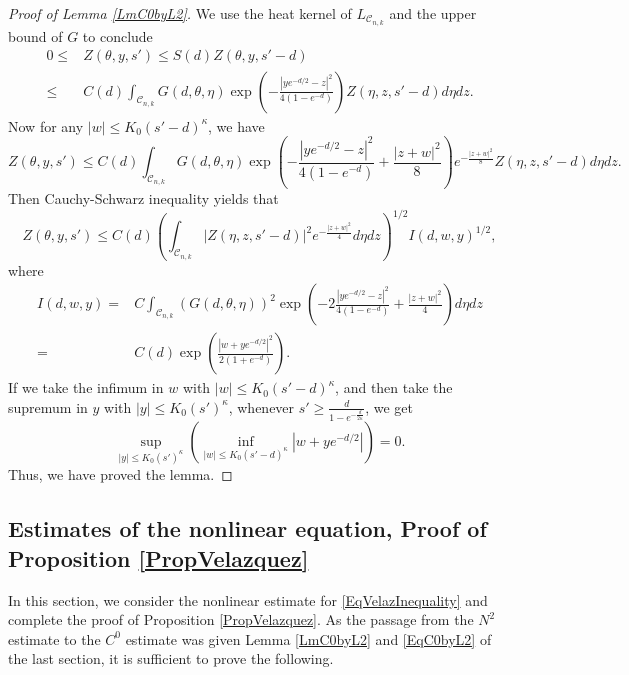 \documentclass[11pt]{amsart}
\numberwithin{equation}{section}
\numberwithin{equation}{section}
\newcommand{\cC}{\mathcal{C}}
\begin{document}
	\begin{proof}[Proof of Lemma \ref{LmC0byL2}]   
		We use the heat kernel of $L_{\cC_{n,k}}$ and the upper bound of $G$ to conclude
		\[
		\begin{split}
			0\leq&
			Z(\theta,y,s')
			\leq S(d)Z(\theta,y,s'-d)
			\\
			\leq&
			C(d)\int_{\cC_{n,k}} G(d,\theta,\eta)\exp\left(-\frac{|y e^{-d/2}-z|^2}{4(1-e^{-d})}\right)
			Z(\eta,z,s'-d)d\eta dz.
		\end{split}
		\]
		Now for any $|w|\leq K_0(s'-d)^{\kappa}$, we have
		\[
		Z(\theta,y,s')
		\leq
		C(d)\int_{\cC_{n,k}} G(d,\theta,\eta)\exp\left(-\frac{|y e^{-d/2}-z|^2}{4(1-e^{-d})}
		+\frac{|z+w|^2}{8}
		\right)e^{-\frac{|z+w|^2}{8}}
		Z(\eta,z,s'-d)d\eta dz.
		\]
		Then Cauchy-Schwarz inequality yields that
		\[
		Z(\theta,y,s')
		\leq
		C(d)
		\left(\int_{\cC_{n,k}}
		|Z(\eta,z,s'-d)|^2e^{-\frac{|z+w|^2}{4}}
		d\eta dz
		\right)^{1/2}
		I(d,w,y)^{1/2},
		\]
		where
		\[
		\begin{split}
			I(d,w,y)
			=&
			C\int_{\cC_{n,k}}(G(d,\theta,\eta))^2
			\exp\left(-2\frac{|y e^{-d/2}-z|^2}{4(1-e^{-d})}
			+\frac{|z+w|^2}{4}
			\right) d\eta dz
			\\
			=&
			C(d)
			\exp\left(
			\frac{|w+ye^{-d/2}|^2}{2(1+e^{-d})}
			\right).
		\end{split}
		\]
		If we take the infimum in $w$ with $|w|\leq K_0(s'-d)^{\kappa}$, and then take the supremum in $y$ with $|y|\leq K_0(s')^{\kappa}$, whenever $s'\geq \frac{d}{1-e^{-\frac{d}{2\kappa}}}$, we get 
		\[\sup_{|y|\leq K_0(s')^{\kappa}}\left(\inf_{|w|\leq K_0(s'-d)^{\kappa}}|w+ye^{-d/2}|\right)=0.\]
		Thus, we have proved the lemma. 
	\end{proof}
	
	
	\subsection{Estimates of the nonlinear equation, Proof of Proposition \ref{PropVelazquez}}\label{SSVelaz}
	In this section, we consider the nonlinear estimate for \eqref{EqVelazInequality} and complete the proof of Proposition \ref{PropVelazquez}. As the passage from the $N^2$ estimate to the $C^0$ estimate was given Lemma \ref{LmC0byL2} and \eqref{EqC0byL2} of the last section, it is sufficient to prove the following. 
	
\end{document}
